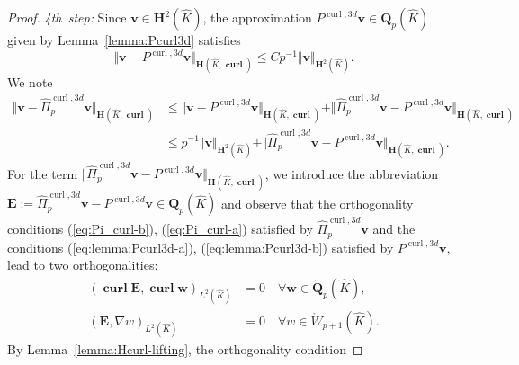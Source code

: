\documentclass{article}
\newcommand{\hatPicurlcom}{\widehat \Pi^{\operatorname*{curl},3d}_p}
\begin{document}
\begin{proof}
\emph{4th~step:} Since ${\mathbf{v}}\in{\mathbf{H}}^{2}(\widehat{K})$, the
approximation $P^{\operatorname*{curl},3d}{\mathbf{v}}\in
\mathbf{Q}_p(\widehat{K})$ given by
Lemma~\ref{lemma:Pcurl3d} satisfies
\begin{equation}
\Vert{\mathbf{v}}-P^{\operatorname*{curl},3d}{\mathbf{v}}\Vert_{{\mathbf{H}%
}(\widehat{K},\operatorname{\mathbf{curl}})}\leq Cp^{-1}\Vert{\mathbf{v}}%
\Vert_{{\mathbf{H}}^{2}(\widehat{K})}. \label{eq:thm:H1curl-approximation-10c}%
\end{equation}
We note
\begin{align*}
\Vert{\mathbf{v}}-\hatPicurlcom{\mathbf{v}}%
\Vert_{{\mathbf{H}}(\widehat{K},\operatorname{\mathbf{curl}})}  &  \leq\Vert
{\mathbf{v}}-P^{\operatorname*{curl},3d}{\mathbf{v}}\Vert_{{\mathbf{H}%
}(\widehat{K},\operatorname{\mathbf{curl}})}
+\Vert\hatPicurlcom{\mathbf{v}}-P^{\operatorname*{curl},3d}{\mathbf{v}%
}\Vert_{{\mathbf{H}}(\widehat{K},\operatorname{\mathbf{curl}})}\\
&  \leq p^{-1}\Vert{\mathbf{v}}\Vert_{{\mathbf{H}}^{2}(\widehat{K})}%
+\Vert\hatPicurlcom{\mathbf{v}}%
-P^{\operatorname*{curl},3d}{\mathbf{v}}\Vert_{{\mathbf{H}}(\widehat{K}%
,\operatorname{\mathbf{curl}})}.
\end{align*}
For the term $\Vert\hatPicurlcom{\mathbf{v}%
}-P^{\operatorname*{curl},3d}{\mathbf{v}}\Vert_{{\mathbf{H}}(\widehat{K}%
,\operatorname{\mathbf{curl}})}$, we introduce the abbreviation ${\mathbf{E}%
}:=\hatPicurlcom{\mathbf{v}}%
-P^{\operatorname*{curl},3d}{\mathbf{v}}\in\mathbf{Q}_p(\widehat{K})$ and observe that the orthogonality
conditions (\ref{eq:Pi_curl-b}), (\ref{eq:Pi_curl-a}) satisfied by
$\hatPicurlcom{\mathbf{v}}$ and the conditions
(\ref{eq:lemma:Pcurl3d-a}), (\ref{eq:lemma:Pcurl3d-b}) satisfied by
$P^{\operatorname*{curl},3d}{\mathbf{v}}$, lead to two orthogonalities:
\begin{subequations}
\label{eq:orth-3d}%
\begin{align}
\label{eq:orth-3d-a}%
(\operatorname{\mathbf{curl}}{\mathbf{E}},\operatorname{\mathbf{curl}}{\mathbf{w}}%
)_{L^{2}(\widehat{K})}& =0\quad\forall{\mathbf{w}}\in\mathring{\mathbf{Q}}_{p}(\widehat{K}),\\
\label{eq:orth-3d-b}%
({\mathbf{E}},\nabla w)_{L^{2}(\widehat{K})}%
&=0\quad\forall w\in\mathring{W}_{p+1}(\widehat{K}). 
\end{align}
\end{subequations}
By Lemma~\ref{lemma:Hcurl-lifting}, the orthogonality condition

\end{proof}
\end{document}

